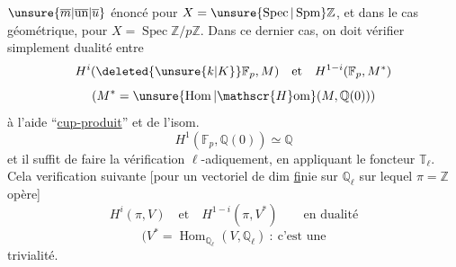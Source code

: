 $\unsure{\overline{m}|\overline{\text{un}}|\overline{u}}$ énoncé pour $X=\unsure{\operatorname{Spec}|\operatorname{Spm}}\mathbb{Z}$, et dans le cas géométrique, pour $X=\operatorname{Spec}\mathbb{Z}/p\mathbb{Z}$. Dans ce dernier cas, on doit vérifier simplement  dualité entre
\[
H^i(\deleted{\unsure{k|K}}\mathbb{F}_p,M)\quad\text{et}\quad H^{1-i}(\mathbb{F}_p,M^*)
\]
\[
(M^*=\unsure{\operatorname{Hom}|\mathscr{H}\mathrm{om}}(M,\mathbb{Q}(0)))
\]
à l'aide  ``\uline{cup-produit}'' et de l'isom.
\[
H^1(\mathbb{F}_p,\mathbb{Q}(0))\simeq\mathbb{Q}
\]
et il suffit de faire la vérification $\ell$-adiquement, en appliquant le foncteur $\mathbb{T}_\ell$. Cela  \unsure{:|;}  verification suivante [pour un vectoriel de dim \uline{f}inie sur $\mathbb{Q}_\ell$ sur lequel $\pi=\mathbb{Z}$ opère]
\[
H^i(\pi,V)\quad\text{et}\quad H^{1-i}(\pi,V^*)\qquad\text{en dualité}
\]
\[
(V^*=\operatorname{Hom}_{\mathbb{Q}_\ell}(V,\mathbb{Q}_\ell)\ :\ \text{c'est une}
\]
trivialité.
